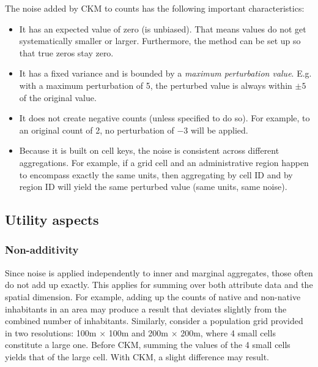 The noise added by CKM to counts has the following important characteristics:
\begin{itemize}
    \item It has an expected value of zero (is unbiased). That means values do not get systematically smaller or larger. Furthermore, the method can be set up so that true zeros stay zero.
    \item It has a fixed variance and is bounded by a \emph{maximum perturbation value}. E.g. with a maximum perturbation of 5, the perturbed value is always within $\pm 5$ of the original value.
    \item It does not create negative counts (unless specified to do so). For example, to an original count of 2, no perturbation of $-3$ will be applied.
    \item Because it is built on cell keys, the noise is consistent across different aggregations. For example, if a grid cell and an administrative region happen to encompass exactly the same units, then aggregating by cell ID and by region ID will yield the same perturbed value (same units, same noise).
\end{itemize}


\subsection{Utility aspects} \label{sec:ckm_util}

\subsubsection{Non-additivity}

Since noise is applied independently to inner and marginal aggregates, those often do not add up exactly. This applies  for summing over both attribute data and the spatial dimension. For example, adding up the counts of native and non-native inhabitants in an area may produce a result that deviates slightly from the combined number of inhabitants.
Similarly, consider a population grid provided in two resolutions: 100m $\times$ 100m and 200m $\times$ 200m, where 4 small cells constitute a large one. Before CKM, summing the values of the 4 small cells yields that of the large cell. With CKM, a slight difference may result.

